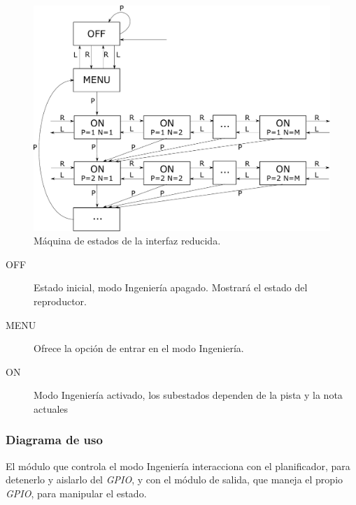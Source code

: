 \begin{figure}[H]
	\noindent \begin{centering}
		\includegraphics[width=\linewidth*3/4]{capitulo4/engineer}
		\par\end{centering}
	\smallskip
	\caption{\label{fig:engineer} Máquina de estados de la interfaz reducida.}
\end{figure} 

\smallskip

\begin{description}
	\item[OFF] Estado inicial, modo Ingeniería apagado. Mostrará el estado del reproductor.
	\item[MENU] Ofrece la opción de entrar en el modo Ingeniería.
	\item[ON] Modo Ingeniería activado, los subestados dependen de la pista y la nota actuales
\end{description}

\subsubsection{Diagrama de uso}

El módulo que controla el modo Ingeniería interacciona con el planificador, para detenerlo y aislarlo del \textit{GPIO}, y con el módulo de salida, que maneja el propio \textit{GPIO}, para manipular el estado.

\smallskip

